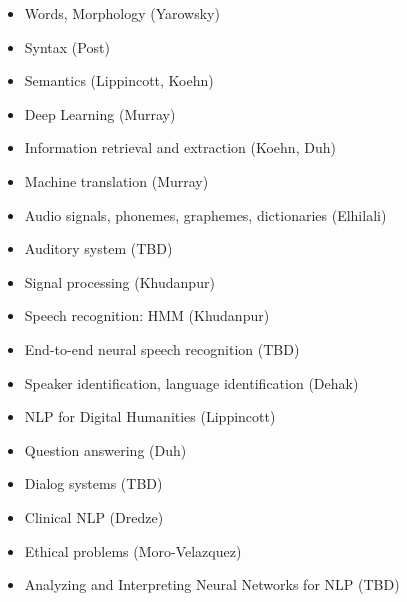 \documentclass[landscape]{jhuslides3C}
\begin{document}

\vfill
\begin{itemize} \itemsep 0mm
\item Words, Morphology (Yarowsky)
\item Syntax (Post)
\item Semantics (Lippincott, Koehn)
\item Deep Learning (Murray)
\item Information retrieval and extraction (Koehn, Duh)
\item Machine translation (Murray)
\end{itemize}
\vfill




\vfill
\begin{itemize} \itemsep 0mm
\item Audio signals, phonemes, graphemes, dictionaries (Elhilali)
\item Auditory system (TBD)
\item Signal processing (Khudanpur)
\item Speech recognition: HMM (Khudanpur)
\item End-to-end neural speech recognition (TBD) 
\item Speaker identification, language identification (Dehak)
\end{itemize}
\vfill


\vfill
\begin{itemize} \itemsep 0mm
\item NLP for Digital Humanities (Lippincott)
\item Question answering (Duh)
\item Dialog systems (TBD)
\item Clinical NLP (Dredze)
\item Ethical problems (Moro-Velazquez)
\item Analyzing and Interpreting Neural Networks for NLP (TBD)
\end{itemize}
\vfill

\end{document}
